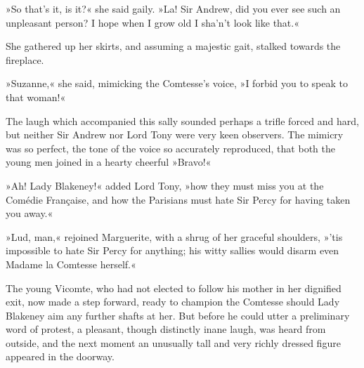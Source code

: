 »So that's it, is it?« she said gaily. »La! Sir Andrew, did you ever see such an unpleasant person? I hope when I grow old I sha'n't look like that.«

She gathered up her skirts, and assuming a majestic gait, stalked towards the fireplace.

»Suzanne,« she said, mimicking the Comtesse's voice, »I forbid you to speak to that woman!«

The laugh which accompanied this sally sounded perhaps a trifle forced and hard, but neither Sir Andrew nor Lord Tony were very keen observers. The mimicry was so perfect, the tone of the voice so accurately reproduced, that both the young men joined in a hearty cheerful »Bravo!«

»Ah! Lady Blakeney!« added Lord Tony, »how they must miss you at the Comédie Française, and how the Parisians must hate Sir Percy for having taken you away.«

»Lud, man,« rejoined Marguerite, with a shrug of her graceful shoul\-ders, »'tis impossible to hate Sir Percy for anything; his witty sallies would disarm even Madame la Comtesse herself.«

The young Vicomte, who had not elected to follow his mother in her dignified exit, now made a step forward, ready to champion the Comtesse should Lady Blakeney aim any further shafts at her. But before he could utter a preliminary word of protest, a pleasant, though distinctly inane laugh, was heard from outside, and the next moment an unusually tall and very richly dressed figure appeared in the doorway.